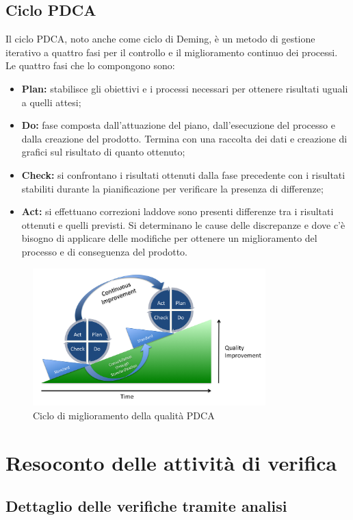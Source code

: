	\subsection{Ciclo PDCA}
	Il ciclo PDCA, noto anche come ciclo di Deming, è un metodo di gestione iterativo a quattro fasi per il controllo e il miglioramento continuo dei processi.\\
	Le quattro fasi che lo compongono sono:
			\begin{itemize}
				\item \textbf{Plan:} stabilisce gli obiettivi e i processi necessari per ottenere risultati uguali a quelli attesi;
				\item \textbf{Do:} fase composta dall'attuazione del piano, dall'esecuzione del processo e dalla creazione del prodotto. Termina con una raccolta dei dati e creazione di grafici sul risultato di quanto ottenuto;
				\item \textbf{Check:} si confrontano i risultati ottenuti dalla fase precedente con i risultati stabiliti durante la pianificazione per verificare la presenza di differenze;
				\item \textbf{Act:} si effettuano correzioni laddove sono presenti differenze tra i risultati ottenuti e quelli previsti. Si determinano le cause delle discrepanze e dove c'è bisogno di applicare delle modifiche per ottenere un miglioramento del processo e di conseguenza del prodotto.
			\end{itemize}
			\begin{figure}[h]
				\centering
				\includegraphics[width=90mm]{images/pdca.png}
				\caption{Ciclo di miglioramento della qualità PDCA}
				\label{fig:pdca}
			\end{figure}
		\pagebreak

\section{Resoconto delle attività di verifica}
	\subsection{Dettaglio delle verifiche tramite analisi}

